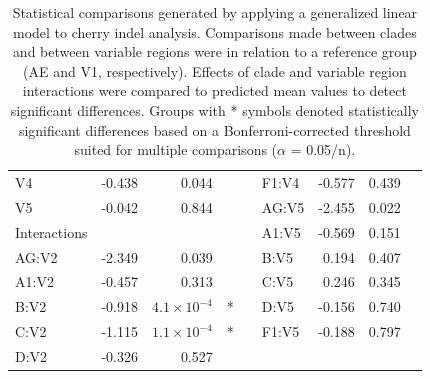 \documentclass[12pt]{article}
\begin{document}
\begin{table}[htbp]
\begin{tabular}{lrrcclrrc}
  \hspace{1em}V4 & -0.438 & 0.044 & & &\hspace{1em}F1:V4 & -0.577 & 0.439 &  \\ 
  \hspace{1em}V5 & -0.042 & 0.844 & & &\hspace{1em}AG:V5 & -2.455 & 0.022 & \\ 
  Interactions & & & &&\hspace{1em}A1:V5 & -0.569 & 0.151 & \\ 
  \hspace{1em}AG:V2 & -2.349 & 0.039 & & &\hspace{1em}B:V5 & 0.194 & 0.407 & \\ 
  \hspace{1em}A1:V2 & -0.457 & 0.313 &  &&\hspace{1em}C:V5 & 0.246 & 0.345 & \\ 
  \hspace{1em}B:V2 & -0.918 & $4.1\times 10^{-4}$& * & &\hspace{1em}D:V5 & -0.156 & 0.740 & \\ 
  \hspace{1em}C:V2 & -1.115 & $1.1\times 10^{-4}$ & * & &\hspace{1em}F1:V5 & -0.188 & 0.797 & \\ 
  \hspace{1em}D:V2 & -0.326 & 0.527 &  & &\\  
  
  \hline
  \end{tabular}
  
  \caption{
    Statistical comparisons generated by applying a generalized linear model to cherry indel analysis. 
    Comparisons made between clades and between variable regions were in relation to a reference group (AE and V1, respectively). 
    Effects of clade and variable region interactions were compared to predicted mean values to detect significant differences. 
    Groups with * symbols denoted statistically significant differences based on a Bonferroni-corrected threshold suited for multiple comparisons ($\alpha$ = 0.05/n). 
    }
    \label{tab:glm}
\end{table}
\end{document}
